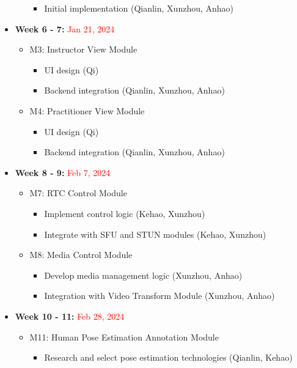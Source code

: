 \documentclass[12pt, titlepage]{article}
\newcommand{\rt}[1]{\textcolor{red}{#1}}
\begin{document}
\begin{itemize}
\begin{itemize}
\begin{itemize}
          \item Initial implementation (Qianlin, Xunzhou, Anhao)
      \end{itemize}
  \end{itemize}
  \item \textbf{Week 6 - 7:} \rt{Jan 21, 2024}
  \begin{itemize}
      \item M3: Instructor View Module
      \begin{itemize}
          \item UI design (Qi)
          \item Backend integration (Qianlin, Xunzhou, Anhao)
      \end{itemize}
      \item M4: Practitioner View Module
      \begin{itemize}
          \item UI design (Qi)
          \item Backend integration (Qianlin, Xunzhou, Anhao)
      \end{itemize}
  \end{itemize}
  \item \textbf{Week 8 - 9:} \rt{Feb 7, 2024}
  \begin{itemize}
      \item M7: RTC Control Module
      \begin{itemize}
          \item Implement control logic (Kehao, Xunzhou)
          \item Integrate with SFU and STUN modules (Kehao, Xunzhou)
      \end{itemize}
      \item M8: Media Control Module
      \begin{itemize}
          \item Develop media management logic (Xunzhou, Anhao)
          \item Integration with Video Transform Module (Xunzhou, Anhao)
      \end{itemize}
  \end{itemize}
  \item \textbf{Week 10 - 11:} \rt{Feb 28, 2024}
  \begin{itemize}
      \item M11: Human Pose Estimation Annotation Module
      \begin{itemize}
          \item Research and select pose estimation technologies (Qianlin, Kehao)

\end{itemize}
\end{itemize}
\end{itemize}
\end{document}

